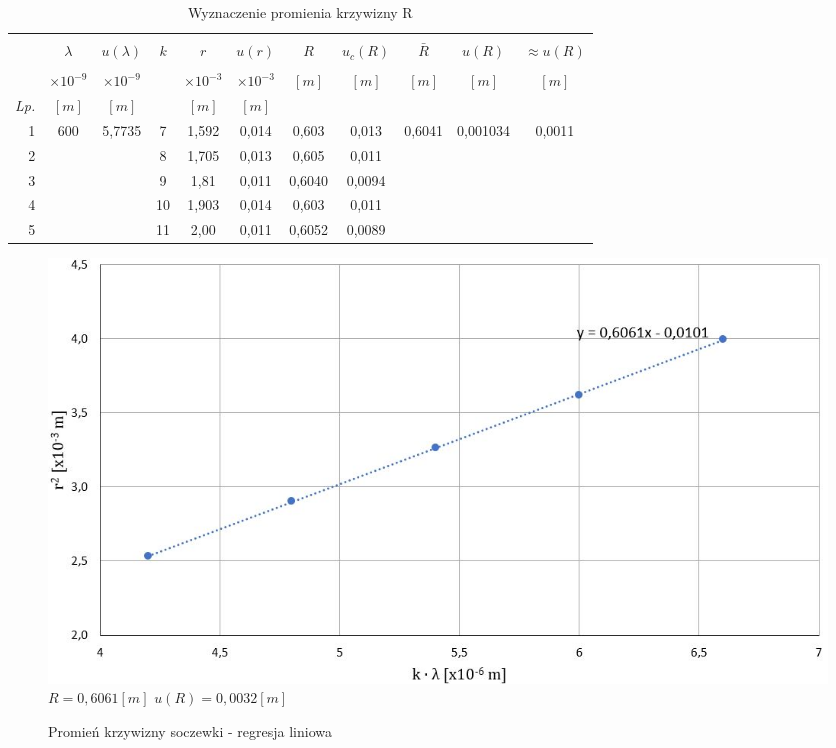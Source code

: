 \documentclass[polish, 11pt, a4paper]{article}
\begin{document}
\begin{table}[h]
		\captionsetup{margin = 0cm}
		\caption{Wyznaczenie promienia krzywizny R}
		\begin{tabular}{|r|c|c|c|c|c|c|c|c|c|c|} \hline
			&&&&&&&&&& \\[-1em]
				&	\(\lambda\)	&	\(u(\lambda)\)	&	\(k\)	&	\(r\)	&	\(u(r)\)	&	\(R\)	&	\(u_c(R)\)	&	\(\bar{R}\)	&	\(u(R)\)	&	\(\approx u(R)\)	\\
			&&&&&&&&&& \\[-1em]
			 &\(\times{10^{-9}} \)&\(\times{10^{-9}} \)& &\(\times{10^{-3}} \)&\(\times{10^{-3}} \)&\multirow{2}{*}{\([m]\)}&\multirow{2}{*}{\([m]\)}&\multirow{2}{*}{\([m]\)}&\multirow{2}{*}{\([m]\)}&\multirow{2}{*}{\([m]\)}\\
			\textit{Lp.}	&	\([m]\)	&	\([m]\)	&		&	\([m]\)	&	\([m]\)	&	&	&	&	&	\\\hline
			1	&	\multirow{5}{*}{600}&	\multirow{5}{*}{5,7735}	&	7	&	1,592	&	0,014	&	0,603	&	0,013	&	\multirow{5}{*}{0,6041}	&	\multirow{5}{*}{0,001034}	&	\multirow{5}{*}{0,0011}	\\ \cline{1-1} \cline{4-8}
			2	&		&		&	8	&	1,705	&	0,013	&	0,605	&	0,011	&		&		&		\\ \cline{1-1} \cline{4-8}
			3	&		&		&	9	&	1,81	&	0,011	&	0,6040	&	0,0094	&		&		&		\\ \cline{1-1} \cline{4-8}
			4	&		&		&	10	&	1,903	&	0,014	&	0,603	&	0,011	&		&		&		\\ \cline{1-1} \cline{4-8}
			5	&		&		&	11	&	2,00	&	0,011	&	0,6052	&	0,0089	&		&		&		\\\hline
		\end{tabular}
		\end{table}
		\begin{figure}[H]
			\centering
			\caption{Promień krzywizny soczewki - regresja liniowa}
			\includegraphics[width=.88\textwidth]{Fizyka81Wykres}
			\\
			\vspace{.1cm}
			\(R=0,6061[m]\) \hspace{1cm}\(u(R)=0,0032[m]\)
		\end{figure}
	
\end{document}
